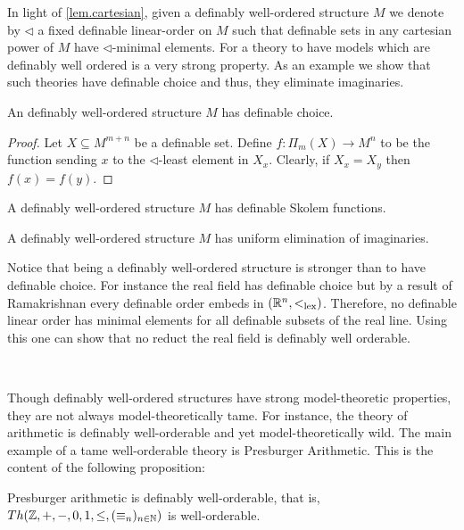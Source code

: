 In light of \ref{lem.cartesian}, given a definably well-ordered structure $M$ we denote by $\lhd$ a fixed definable linear-order on $M$ such that definable sets in any cartesian power of $M$ have $\lhd$-minimal elements. For a theory to have models which are definably well ordered is a very strong property. As an example we show that such theories have definable choice and thus, they eliminate imaginaries. 

\begin{prop}
An definably well-ordered structure $M$ has definable choice. 
\end{prop}

\begin{proof}
Let $X\subseteq M^{m+n}$ be a definable set. Define $f:\Pi_m(X)\rightarrow M^n$ to be the function sending $x$ to the $\lhd$-least element in $X_x$. Clearly, if $X_x=X_y$ then $f(x)=f(y)$. 
\end{proof}

\begin{cor}
A definably well-ordered structure $M$ has definable Skolem functions. 
\end{cor}

\begin{cor}
A definably well-ordered structure $M$ has uniform elimination of imaginaries. 
\end{cor}

Notice that being a definably well-ordered structure is stronger than to have definable choice. For instance the real field has definable choice but by a result of Ramakrishnan every definable order embeds in $({\mathbb R}^n,<_{\text{lex}})$. Therefore, no definable linear order has minimal elements for all definable subsets of the real line. Using this one can show that no reduct the real field is definably well orderable. 

\

Though definably well-ordered structures have strong model-theoretic properties, they are not always model-theoretically tame. For instance, the theory of arithmetic is definably well-orderable and yet model-theoretically wild. The main example of a tame well-orderable theory is Presburger Arithmetic. This is the content of the following proposition: 

\begin{prop}\label{preswellorder}
Presburger arithmetic is definably well-orderable, that is, $Th({\mathbb Z},+,-,0,1,\leq,(\equiv_n)_{n\in \mathbb{N}})$ is well-orderable.
\end{prop}

